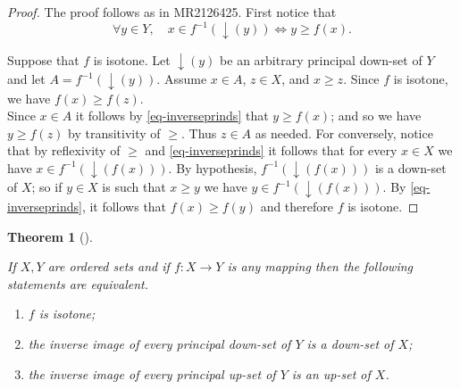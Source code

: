 \documentclass[
  letterpaper,
  10pt,
  reqno,
  twopage,
  openany]{book}
\providecommand{\tightlist}{%
  \setlength{\itemsep}{0pt}\setlength{\parskip}{0pt}}\usepackage{longtable,booktabs,array}
\theoremstyle{plain}
\theoremstyle{definition}
\theoremstyle{definition}
\theoremstyle{definition}
\theoremstyle{plain}
\theoremstyle{plain}
\newtheorem{theorem}{Theorem}[chapter]
\theoremstyle{remark}
\begin{document}
\begin{proof}

The proof follows as in MR2126425. First notice that \begin{equation}
\label{eq-inverseprinds}
\forall y\in Y, \quad x\in f^{-1}({\downarrow}(y)) \Longleftrightarrow y\geq f(x).
\end{equation}

Suppose that \(f\) is isotone. Let \({\downarrow}(y)\) be an arbitrary
principal down-set of \(Y\) and let \(A=f^{-1}({\downarrow}(y))\).
Assume \(x\in A\), \(z\in X\), and \(x\geq z\). Since \(f\) is isotone,
we have \(f(x)\geq f(z)\).\\
Since \(x\in A\) it follows by \eqref{eq-inverseprinds} that
\(y\geq f(x)\); and so we have \(y\geq f(z)\) by transitivity of
\(\geq\). Thus \(z\in A\) as needed. For conversely, notice that by
reflexivity of \(\geq\) and \eqref{eq-inverseprinds} it follows that for
every \(x\in X\) we have \(x\in f^{-1}({\downarrow}(f(x)))\). By
hypothesis, \(f^{-1}({\downarrow}(f(x)))\) is a down-set of \(X\); so if
\(y\in X\) is such that \(x\geq y\) we have
\(y\in f^{-1}({\downarrow}(f(x)))\). By \eqref{eq-inverseprinds}, it
follows that \(f(x)\geq f(y)\) and therefore \(f\) is isotone.

\end{proof}

\leavevmode{}%
\begin{theorem}[]\label{thm-op-inverse-image}

If \(X, Y\) are ordered sets and if \(f:X\to Y\) is any mapping then the
following statements are equivalent.

\begin{enumerate}
\def\labelenumi{\arabic{enumi}.}
\tightlist
\item
  \(f\) is isotone;
\item
  the inverse image of every principal down-set of \(Y\) is a down-set
  of \(X\);
\item
  the inverse image of every principal up-set of \(Y\) is an up-set of
  \(X\).
\end{enumerate}

\end{theorem}
\end{document}
